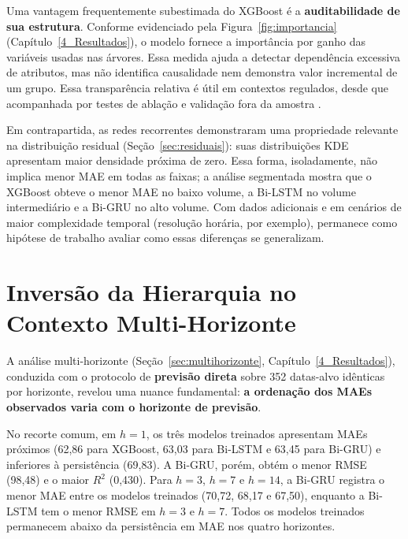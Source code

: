 Uma vantagem frequentemente subestimada do XGBoost é a \textbf{auditabilidade de sua estrutura}. Conforme evidenciado pela Figura~\ref{fig:importancia} (Capítulo~\ref{4_Resultados}), o modelo fornece a importância por ganho das variáveis usadas nas árvores. Essa medida ajuda a detectar dependência excessiva de atributos, mas não identifica causalidade nem demonstra valor incremental de um grupo. Essa transparência relativa é útil em contextos regulados, desde que acompanhada por testes de ablação e validação fora da amostra \cite{rudin2019stop}.

Em contrapartida, as redes recorrentes demonstraram uma propriedade relevante na distribuição residual (Seção~\ref{sec:residuais}): suas distribuições KDE apresentam maior densidade próxima de zero. Essa forma, isoladamente, não implica menor MAE em todas as faixas; a análise segmentada mostra que o XGBoost obteve o menor MAE no baixo volume, a Bi-LSTM no volume intermediário e a Bi-GRU no alto volume. Com dados adicionais e em cenários de maior complexidade temporal (resolução horária, por exemplo), permanece como hipótese de trabalho avaliar como essas diferenças se generalizam.

\section[Inversão da Hierarquia por Horizonte]{Inversão da Hierarquia no Contexto Multi-\hspace{0pt}Horizonte}\label{sec:discussao_multihorizonte}

A análise multi-horizonte (Seção~\ref{sec:multihorizonte}, Capítulo~\ref{4_Resultados}), conduzida com o protocolo de \textbf{previsão direta} sobre 352 datas-alvo idênticas por horizonte, revelou uma nuance fundamental: \textbf{a ordenação dos MAEs observados varia com o horizonte de previsão}.

No recorte comum, em $h = 1$, os três modelos treinados apresentam MAEs próximos (62,86 para XGBoost, 63,03 para Bi-LSTM e 63,45 para Bi-GRU) e inferiores à persistência (69,83). A Bi-GRU, porém, obtém o menor RMSE (98,48) e o maior $R^2$ (0,430). Para $h = 3$, $h=7$ e $h=14$, a Bi-GRU registra o menor MAE entre os modelos treinados (70,72, 68,17 e 67,50), enquanto a Bi-LSTM tem o menor RMSE em $h=3$ e $h=7$. Todos os modelos treinados permanecem abaixo da persistência em MAE nos quatro horizontes.

